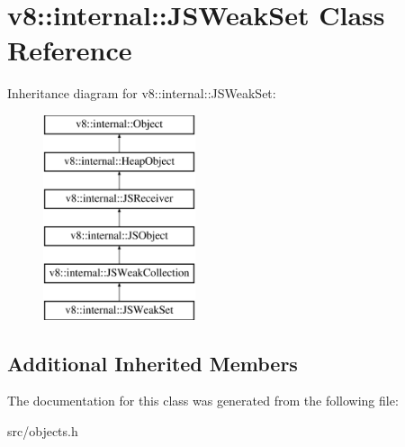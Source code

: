 \hypertarget{classv8_1_1internal_1_1_j_s_weak_set}{}\section{v8\+:\+:internal\+:\+:J\+S\+Weak\+Set Class Reference}
\label{classv8_1_1internal_1_1_j_s_weak_set}
Inheritance diagram for v8\+:\+:internal\+:\+:J\+S\+Weak\+Set\+:\begin{figure}[H]
\begin{center}
\leavevmode
\includegraphics[height=6.000000cm]{classv8_1_1internal_1_1_j_s_weak_set}
\end{center}
\end{figure}
\subsection*{Additional Inherited Members}


The documentation for this class was generated from the following file\+:\begin{DoxyCompactItemize}
\item 
src/objects.\+h\end{DoxyCompactItemize}
